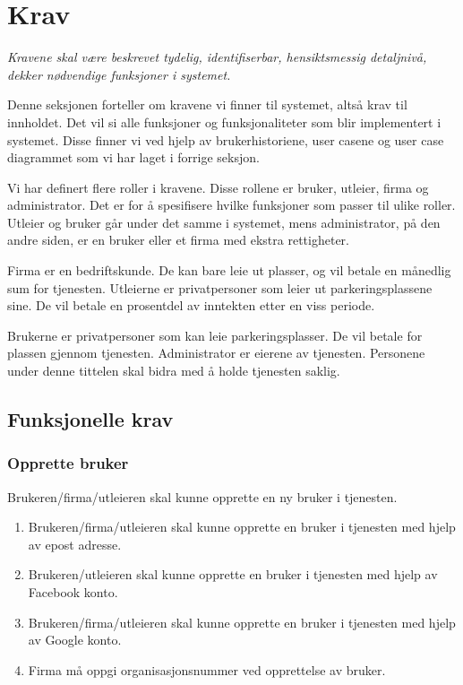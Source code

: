 
\section{Krav}
\textit{Kravene skal være beskrevet tydelig, identifiserbar, hensiktsmessig detaljnivå, dekker nødvendige funksjoner i systemet. }

Denne seksjonen forteller om kravene vi finner til systemet, altså krav til innholdet. Det vil si alle funksjoner og funksjonaliteter som blir implementert i systemet. Disse finner vi ved hjelp av brukerhistoriene, user casene og user case diagrammet som vi har laget i forrige seksjon.


Vi har definert flere roller i kravene. Disse rollene er bruker, utleier, firma og administrator. Det er for å spesifisere hvilke funksjoner som passer til ulike roller. Utleier og bruker går under det samme i systemet, mens administrator, på den andre siden, er en bruker eller et firma med ekstra rettigheter. 

Firma er en bedriftskunde. De kan bare leie ut plasser, og vil betale en månedlig sum for tjenesten. 
Utleierne er privatpersoner som leier ut parkeringsplassene sine. De vil betale en prosentdel av inntekten etter en viss periode.

Brukerne er privatpersoner som kan leie parkeringsplasser. De vil betale for plassen gjennom tjenesten. 
Administrator er eierene av tjenesten. 
Personene under denne tittelen skal bidra med å holde tjenesten saklig.

\subsection{Funksjonelle krav}
\subsubsection{Opprette bruker}
\label{registere_bruker}
Brukeren/firma/utleieren skal kunne opprette en ny bruker i tjenesten.
\begin{enumerate}[label=(\alph*)]
    \item Brukeren/firma/utleieren skal kunne opprette en bruker i tjenesten med hjelp av epost adresse.
    \item Brukeren/utleieren skal kunne opprette en bruker i tjenesten med hjelp av Facebook konto.
    \item Brukeren/firma/utleieren skal kunne opprette en bruker i tjenesten med hjelp av Google konto.
    \item Firma må oppgi organisasjonsnummer ved opprettelse av bruker.
\end{enumerate}


